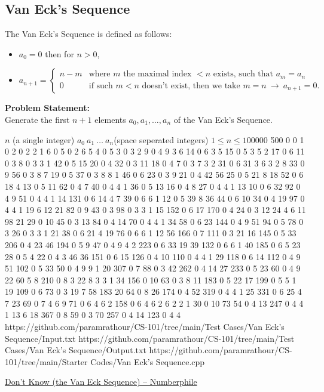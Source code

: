 \subsection{Van Eck's Sequence}
The Van Eck's Sequence is defined as follows:
\begin{itemize}
	\item $a_0 = 0$ then for $n>0$,\\
	\item $a_{n+1} = \begin{cases}
		n-m & \text{where $m$ the maximal index $<n$ exists, such that $a_{m}=a_{n}$}\\
		0 & \text{if such $m<n$ doesn't exist, then we take $m=n\ \rightarrow\ a_{n+1}=0$.}
	\end{cases}$
\end{itemize}
\textbf{Problem Statement:}\\
Generate the first $n+1$ elements $a_0,a_1,\ldots,a_n$ of the Van Eck's Sequence.
\begin{testcasesMore}
	{$n$ \hfill(a single integer)}
	{$a_0\ a_1\ \ldots\ a_n$\hfill(space seperated integers)}
	{$1 \leq n \leq 100000$}
	{500}
	{0 0 1 0 2 0 2 2 1 6 0 5 0 2 6 5 4 0 5 3 0 3 2 9 0 4 9 3 6 14 0 6 3 5 15 0 5 3 5 2 17 0 6 11 0 3 8 0 3 3 1 42 0 5 15 20 0 4 32 0 3 11 18 0 4 7 0 3 7 3 2 31 0 6 31 3 6 3 2 8 33 0 9 56 0 3 8 7 19 0 5 37 0 3 8 8 1 46 0 6 23 0 3 9 21 0 4 42 56 25 0 5 21 8 18 52 0 6 18 4 13 0 5 11 62 0 4 7 40 0 4 4 1 36 0 5 13 16 0 4 8 27 0 4 4 1 13 10 0 6 32 92 0 4 9 51 0 4 4 1 14 131 0 6 14 4 7 39 0 6 6 1 12 0 5 39 8 36 44 0 6 10 34 0 4 19 97 0 4 4 1 19 6 12 21 82 0 9 43 0 3 98 0 3 3 1 15 152 0 6 17 170 0 4 24 0 3 12 24 4 6 11 98 21 29 0 10 45 0 3 13 84 0 4 14 70 0 4 4 1 34 58 0 6 23 144 0 4 9 51 94 0 5 78 0 3 26 0 3 3 1 21 38 0 6 21 4 19 76 0 6 6 1 12 56 166 0 7 111 0 3 21 16 145 0 5 33 206 0 4 23 46 194 0 5 9 47 0 4 9 4 2 223 0 6 33 19 39 132 0 6 6 1 40 185 0 6 5 23 28 0 5 4 22 0 4 3 46 36 151 0 6 15 126 0 4 10 110 0 4 4 1 29 118 0 6 14 112 0 4 9 51 102 0 5 33 50 0 4 9 9 1 20 307 0 7 88 0 3 42 262 0 4 14 27 233 0 5 23 60 0 4 9 22 60 5 8 210 0 8 3 22 8 3 3 1 34 156 0 10 63 0 3 8 11 183 0 5 22 17 199 0 5 5 1 19 109 0 6 73 0 3 19 7 58 183 20 64 0 8 26 174 0 4 52 319 0 4 4 1 25 331 0 6 25 4 7 23 69 0 7 4 6 9 71 0 6 4 6 2 158 0 6 4 6 2 6 2 2 1 30 0 10 73 54 0 4 13 247 0 4 4 1 13 6 18 367 0 8 59 0 3 70 257 0 4 14 123 0 4 4}
	{https://github.com/paramrathour/CS-101/tree/main/Test Cases/Van Eck's Sequence/Input.txt}
	{https://github.com/paramrathour/CS-101/tree/main/Test Cases/Van Eck's Sequence/Output.txt}
	{https://github.com/paramrathour/CS-101/tree/main/Starter Codes/Van Eck's Sequence.cpp}
\end{testcasesMore}
\begin{funvideo}
	\href{https://youtu.be/etMJxB-igrc}{Don't Know (the Van Eck Sequence) -- Numberphile}
\end{funvideo}
